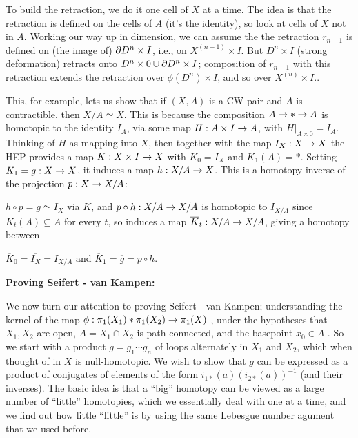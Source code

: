\ssk

To build the retraction, we do it one cell of $X$ at a time. The idea is that
the retraction is defined on the cells of $A$ (it's the identity), so look
at cells of $X$ not in $A$. Working our way up in dimension, we can assume
the the retraction $r_{n-1}$
is defined on (the image of) $\partial D^n\times I$, i.e., on $X^{(n-1)}\times I$.
But $D^n\times I$ (strong deformation) retracts onto 
$D^n\times 0\cup \partial D^n\times I$; composition of $r_{n-1}$ with 
this retraction extends the retraction over $\phi(D^n)\times I$, and 
so over $X^{(n)}\times I$..

\msk

This, for example, lets us show that if $(X,A)$ is a CW pair and 
$A$ is contractible, then $X/A\simeq X$. This is because the
composition $A\rightarrow *\rightarrow A$ is homotopic to the identity $I_A$, via some map
$H:A\times I\rightarrow A$, with $H|_{A\times 0}=I_A$. Thinking of $H$ as
mapping into $X$, then together with the map $I_X:X\rightarrow X$ the HEP
provides a map $K:X\times I\rightarrow X$ with $K_0=I_X$ and $K_1(A)=*$.
Setting $K_1=g:X\rightarrow X$, it induces a map $h:X/A\rightarrow X$. This is a homotopy
inverse of the projection $p:X\rightarrow X/A$:

\msk

$h\circ p=g\simeq I_X$ via $K$, and $p\circ h:X/A\rightarrow X/A$
is homotopic to $I_{X/A}$ since $K_t(A)\subseteq A$ for every $t$,
so induces a map $\overline{K}_t:X/A\rightarrow X/A$, giving a homotopy
between 

$\overline{K}_0=\overline{I_X}=I_{X/A}$ and 
$\overline{K}_1=\overline{g}=p\circ h$.

\bsk

{\bf Proving Seifert - van Kampen:}

\msk

We now turn our attention to proving Seifert - van Kampen; understanding
the kernel of the map $\phi : \pi_1(X_1)*\pi_1(X_2)\rightarrow\pi_1(X)$ , 
under the hypotheses
that $X_1,X_2$ are open, $A=X_1\cap X_2$ is path-connected, and the
basepoint $x_0\in A$ . So we start with a product $g = g_1\cdots g_n$ 
of loops alternately in $X_1$ and $X_2$, which when thought of in $X$
is null-homotopic. We wish to show that $g$ can be expressed as a 
product of conjugates of elements of the form $i_{1*}(a)(i_{2*}(a))^{-1}$
(and their inverses). The basic idea is that a ``big'' homotopy can be
viewed as a large number of ``little'' homotopies, which
we essentially deal with one at a time, and we find out how
little ``little'' is by using the same Lebesgue number agument that we
used before.

